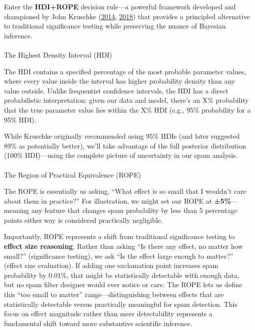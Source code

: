\documentclass[
  letterpaper,
  DIV=11,
  numbers=noendperiod]{scrartcl}
\makeatletter
\let\oldparagraph\paragraph
\renewcommand{\paragraph}{
    \@ifstar
      \xxxParagraphStar
      \xxxParagraphNoStar
  }
\newcommand{\xxxParagraphStar}[1]{\oldparagraph*{#1}\mbox{}}
\newcommand{\xxxParagraphNoStar}[1]{\oldparagraph{#1}\mbox{}}
\makeatother
\begin{document}
Enter the \textbf{HDI+ROPE} decision rule---a powerful framework
developed and championed by John Kruschke
(\href{https://www.amazon.com/Doing-Bayesian-Data-Analysis-Tutorial/dp/0124058884}{2014},
\href{https://link.springer.com/article/10.3758/s13423-017-1272-1}{2018})
that provides a principled alternative to traditional significance
testing while preserving the nuance of Bayesian inference.

\paragraph{The Highest Density Interval
(HDI)}\label{the-highest-density-interval-hdi}

The HDI contains a specified percentage of the most probable parameter
values, where every value inside the interval has higher probability
density than any value outside. Unlike frequentist confidence intervals,
the HDI has a direct probabilistic interpretation: given our data and
model, there's an X\% probability that the true parameter value lies
within the X\% HDI (e.g., 95\% probability for a 95\% HDI).

While Kruschke originally recommended using 95\% HDIs (and later
suggested 89\% as potentially better), we'll take advantage of the full
posterior distribution (100\% HDI)---using the complete picture of
uncertainty in our spam analysis.

\paragraph{The Region of Practical Equivalence
(ROPE)}\label{the-region-of-practical-equivalence-rope}

The ROPE is essentially us asking, ``What effect is so small that I
wouldn't care about them in practice?'' For illustration, we might set
our ROPE at \textbf{±5\%}---meaning any feature that changes spam
probability by less than 5 percentage points either way is considered
practically negligible.

Importantly, ROPE represents a shift from traditional significance
testing to \textbf{effect size reasoning}. Rather than asking ``Is there
any effect, no matter how small?'' (significance testing), we ask ``Is
the effect large enough to matter?'' (effect size evaluation). If adding
one exclamation point increases spam probability by 0.01\%, that might
be statistically detectable with enough data, but no spam filter
designer would ever notice or care. The ROPE lets us define this ``too
small to matter'' range---distinguishing between effects that are
statistically detectable versus practically meaningful for spam
detection. This focus on effect magnitude rather than mere detectability
represents a fundamental shift toward more substantive scientific
inference.
\end{document}
